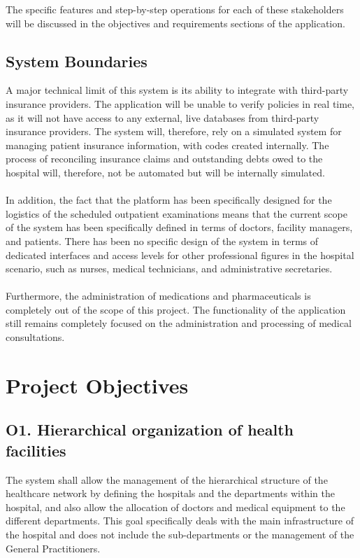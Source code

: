 \documentclass[12pt, a4paper]{article}
\begin{document}
The specific features and step-by-step operations for each of these stakeholders will be discussed in the objectives and requirements sections of the application.

\subsection{System Boundaries}
A major technical limit of this system is its ability to integrate with third-party insurance providers. The application will be unable to verify policies in real time, as it will not have access to any external, live databases from third-party insurance providers. The system will, therefore, rely on a simulated system for managing patient insurance information, with codes created internally. The process of reconciling insurance claims and outstanding debts owed to the hospital will, therefore, not be automated but will be internally simulated.
\\ \\
In addition, the fact that the platform has been specifically designed for the logistics of the scheduled outpatient examinations means that the current scope of the system has been specifically defined in terms of doctors, facility managers, and patients. There has been no specific design of the system in terms of dedicated interfaces and access levels for other professional figures in the hospital scenario, such as nurses, medical technicians, and administrative secretaries.
\\ \\      
Furthermore, the administration of medications and pharmaceuticals is completely out of the scope of this project. The functionality of the application still remains completely focused on the administration and processing of medical consultations.
\newpage
\section{Project Objectives}

\subsection{O1. Hierarchical organization of health facilities} \label{O1}
The system shall allow the management of the hierarchical structure of the healthcare network by defining the hospitals and the departments within the hospital, and also allow the allocation of doctors and medical equipment to the different departments. This goal specifically deals with the main infrastructure of the hospital and does not include the sub-departments or the management of the General Practitioners.
\end{document}
